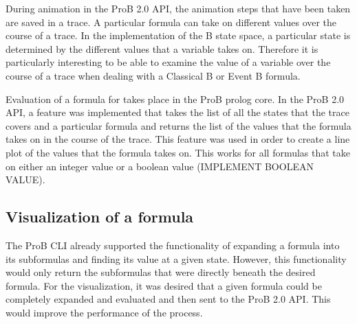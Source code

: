 During animation in the ProB 2.0 API, the animation steps that have been taken are saved in a trace. A particular formula can take on different values over the course of a trace. In the implementation of the B state space, a particular state is determined by the different values that a variable takes on. Therefore it is particularly interesting to be able to examine the value of a variable over the course of a trace when dealing with a Classical B or Event B formula. 

Evaluation of a formula for takes place in the ProB prolog core. In the ProB 2.0 API, a feature was implemented that takes the list of all the states that the trace covers and a particular formula and returns the list of the values that the formula takes on in the course of the trace. This feature was used in order to create a line plot of the values that the formula takes on. This works for all formulas that take on either an integer value or a boolean value (IMPLEMENT BOOLEAN VALUE).

\subsection{Visualization of a formula}

The ProB CLI already supported the functionality of expanding a formula into its subformulas and finding its value at a given state. However, this functionality would only return the subformulas that were directly beneath the desired formula. For the visualization, it was desired that a given formula could be completely expanded and evaluated and then sent to the ProB 2.0 API. This would improve the performance of the process.